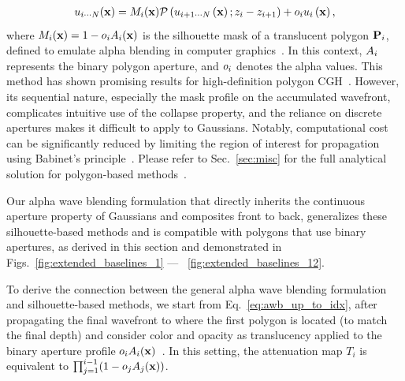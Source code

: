 \begin{align}
u_{i \cdots N} (\mathbf{x}) = M_i(\mathbf{x}) \mathcal{P}\left(u_{i+1 \cdots N}\left(\mathbf{x}  \right); z_i - z_{i + 1} \right) + o_i u_i\left(\mathbf{x} \right),
 \label{eq:silhoutte}   
\end{align}
where $M_i(\mathbf{x}) = 1 - o_i A_i(\mathbf{x})$ is the silhouette mask of a translucent polygon $\mathbf{P}_i$, defined to emulate alpha blending in computer graphics~\cite{matsushima2020introduction}. In this context, $A_i$ represents the binary polygon aperture, and $o_i$ denotes the alpha values. This method has shown promising results for high-definition polygon CGH~\cite{matsushima2009extremely}. However, its sequential nature, especially the mask profile on the accumulated wavefront, complicates intuitive use of the collapse property, and the reliance on discrete apertures makes it difficult to apply to Gaussians. Notably, computational cost can be significantly reduced by limiting the region of interest for propagation using Babinet's principle~\cite{matsushima2020introduction}. Please refer to  Sec.~\ref{sec:misc} for the full analytical solution for polygon-based methods~\cite{zhang2022polygon, park2017recent, kim2008mathematical, ahrenberg2008computer}.

Our alpha wave blending formulation that directly inherits the continuous aperture property of Gaussians and composites front to back, generalizes these silhouette-based methods and is compatible with polygons that use binary apertures, as derived in this section and demonstrated in Figs.~\ref{fig:extended_baselines_1} --- ~\ref{fig:extended_baselines_12}.

To derive the connection between the general alpha wave blending formulation and silhouette-based methods, we start from Eq.~\ref{eq:awb_up_to_idx}, after propagating the final wavefront to where the first polygon is located (to match the final depth) and consider color and opacity as translucency applied to the binary aperture profile $o_i A_i (\mathbf{x})$~\cite{matsushima2020introduction}. In this setting, the attenuation map $T_i$ is equivalent to $\prod_{j=1}^{i-1} (1 - o_{j} A_j(\mathbf{x}))$. 

